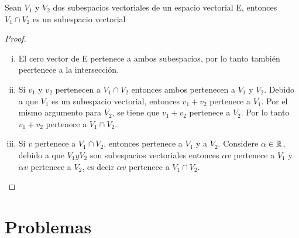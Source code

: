 \begin{theorem}
Sean $V_1$ y $V_2$ dos subespacios vectoriales de un espacio vectorial E, entonces $V_1 \cap V_2$ es un subespacio vectorial
\end{theorem}
\begin{proof}
~\\ \begin{enumerate}[i.]
\item El cero vector de E pertenece a ambos subespacios, por lo tanto también peertenece a la intersección.
\item Si $v_1$ y $v_2$ pertenecen a $V_1 \cap V_2$ entonces ambos pertenecen a $V_1$ y $V_2$. Debido a que $V_1$ es un subespacio vectorial, entonces $v_1 +v_2$ pertenece a $V_1$. Por el mismo argumento para $V_2$, se tiene que $v_1+v_2$ pertenece a $V_2$. Por lo tanto $v_1+v_2$ pertenece a $V_1\cap V_2$.
\item Si $v$ pertenece a  $V_1 \cap V_2$, entonces  pertenece a $V_1$ y a $V_2$.  Considere $\alpha \in \mathbb{R}$,  debido a que $V_1 y V_2$ son subespacios vectoriales entonces $\alpha v$ pertenece a $V_1$ y $\alpha v$ pertenece a $V_2$, es decir $\alpha v$ pertenece a $V_1 \cap V_2$.  
\end{enumerate}
\end{proof}

\section{Problemas}

